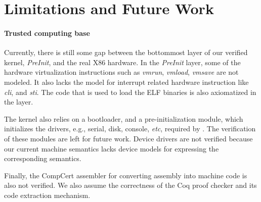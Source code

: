 \section{Limitations and Future Work}
\label{sec:limit}


\paragraph{Trusted computing base}
Currently, there is still some gap between the bottommost layer of our
verified kernel, {\it PreInit}, and the real X86 hardware.
In the {\it PreInit} layer, some of the hardware virtualization
instructions such as {\it vmrun}, {\it vmload}, {\it vmsave}
are not modeled. It also lacks the model for interrupt related hardware
instruction like {\it cli}, and {\it sti}. The code that
is used to load the ELF binaries is also axiomatized in the layer.

The \mCTOS{} kernel also relies on a bootloader, and a pre-initialization
module, which initializes the drivers, e.g.,
serial, disk, console, {\it etc}, required by \mCTOS{}.
The verification of these modules are
left for future work. Device drivers are not verified
because our current machine semantics lacks device models for
expressing the corresponding semantics.

Finally, the CompCert assembler for converting assembly into machine
code is also not verified. We also assume the correctness of the Coq
proof checker and its code extraction mechanism.

